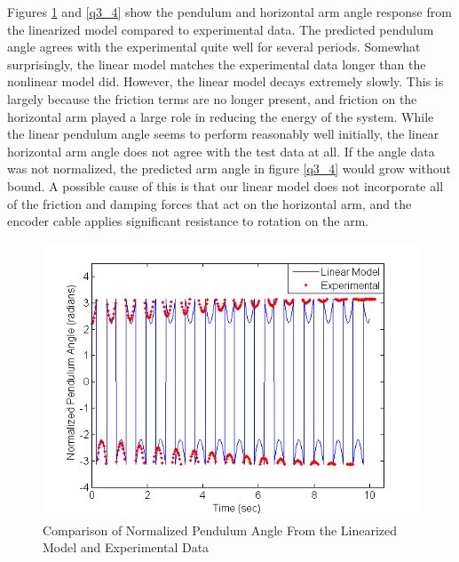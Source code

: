 \documentclass{article}
\theoremstyle{plain}
\theoremstyle{definition}
\theoremstyle{remark}
\begin{document}
Figures \ref{q3_3} and \ref{q3_4} show the pendulum and horizontal arm angle response from the linearized model compared to experimental data. The predicted pendulum angle agrees with the experimental quite well for several periods. Somewhat surprisingly, the linear model matches the experimental data longer than the nonlinear model did. However, the linear model decays extremely slowly. This is largely because the friction terms are no longer present, and friction on the horizontal arm played a large role in reducing the energy of the system. While the linear pendulum angle seems to perform reasonably well initially, the linear horizontal arm angle does not agree with the test data at all. If the angle data was not normalized, the predicted arm angle in figure \ref{q3_4} would grow without bound. A possible cause of this is that our linear model does not incorporate all of the friction and damping forces that act on the horizontal arm, and the encoder cable applies significant resistance to rotation on the arm.\\

\begin{figure}[hbt]
\begin{center}
\includegraphics[width = 13cm]{alphaLinear.png}
\end{center}
\caption{Comparison of Normalized Pendulum Angle From the Linearized Model and Experimental Data}
\label{q3_3}
\end{figure}
\end{document}
